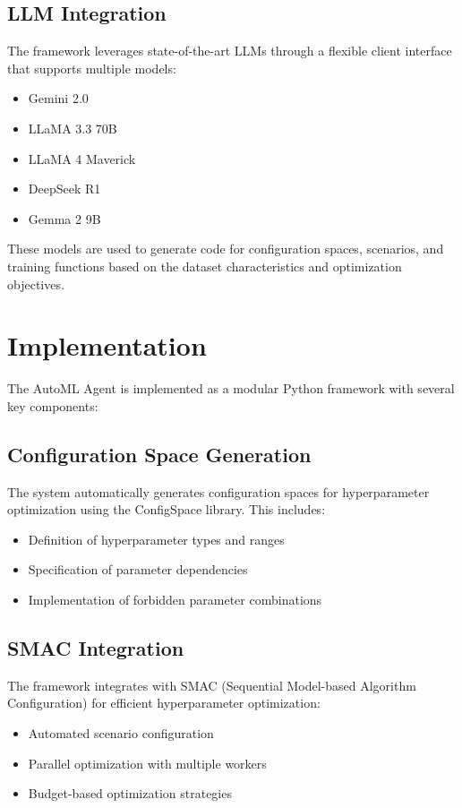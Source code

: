 \documentclass[11pt]{article}
\begin{document}
\subsection{LLM Integration}
The framework leverages state-of-the-art LLMs through a flexible client interface that supports multiple models:
\begin{itemize}
    \item Gemini 2.0
    \item LLaMA 3.3 70B
    \item LLaMA 4 Maverick
    \item DeepSeek R1
    \item Gemma 2 9B
\end{itemize}

These models are used to generate code for configuration spaces, scenarios, and training functions based on the dataset characteristics and optimization objectives.

\section{Implementation}
The AutoML Agent is implemented as a modular Python framework with several key components:

\subsection{Configuration Space Generation}
The system automatically generates configuration spaces for hyperparameter optimization using the ConfigSpace library. This includes:
\begin{itemize}
    \item Definition of hyperparameter types and ranges
    \item Specification of parameter dependencies
    \item Implementation of forbidden parameter combinations
\end{itemize}

\subsection{SMAC Integration}
The framework integrates with SMAC (Sequential Model-based Algorithm Configuration) \cite{lindauer2022smac3versatilebayesianoptimization} for efficient hyperparameter optimization:
\begin{itemize}
    \item Automated scenario configuration
    \item Parallel optimization with multiple workers
    \item Budget-based optimization strategies
\end{itemize}
\end{document}
